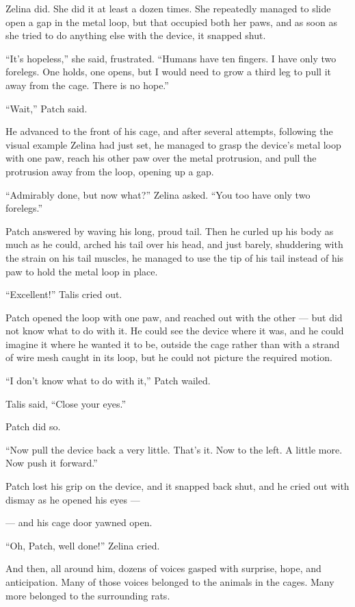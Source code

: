 \documentclass[ebook,oneside,openany,17pt]{memoir}
\newenvironment{tolerant}[1]{%
  \par\tolerance=#1\relax
}{%
  \par
}
\begin{document}
Zelina did. She did it at least a dozen times. She repeatedly managed
to slide open a gap in the metal loop, but that occupied both her
paws, and as soon as she tried to do anything else with the device, it
snapped shut.

\begin{tolerant}{2000}
“It’s hopeless,” she said, frustrated. “Humans have ten fingers. I
have only two forelegs. One holds, one opens, but I would need to grow
a third leg to pull it away from the cage. There is no hope.”
\end{tolerant}

“Wait,” Patch said.

He advanced to the front of his cage, and after several attempts,
following the visual example Zelina had just set, he managed to grasp
the device’s metal loop with one paw, reach his other paw over the
metal protrusion, and pull the protrusion away from the loop, opening
up a gap.

“Admirably done, but now what?” Zelina asked. “You too have only two
forelegs.”

Patch answered by waving his long, proud tail. Then he curled up his
body as much as he could, arched his tail over his head, and just
barely, shuddering with the strain on his tail muscles, he managed to
use the tip of his tail instead of his paw to hold the metal loop in
place.

“Excellent!” Talis cried out.

Patch opened the loop with one paw, and reached out with the other —
but did not know what to do with it. He could see the device where it
was, and he could imagine it where he wanted it to be, outside the
cage rather than with a strand of wire mesh caught in its loop, but he
could not picture the required motion.

“I don’t know what to do with it,” Patch wailed.

Talis said, “Close your eyes.”

Patch did so.

“Now pull the device back a very little. That’s it. Now to the left. A
little more. Now push it forward.”

Patch lost his grip on the device, and it snapped back shut, and he
cried out with dismay as he opened his eyes —

— and his cage door yawned open.

“Oh, Patch, well done!” Zelina cried.

And then, all around him, dozens of voices gasp\-ed with surprise, hope,
and anticipation. Many of those voices belonged to the animals in the
cages. Many more belonged to the surrounding rats.
\end{document}
